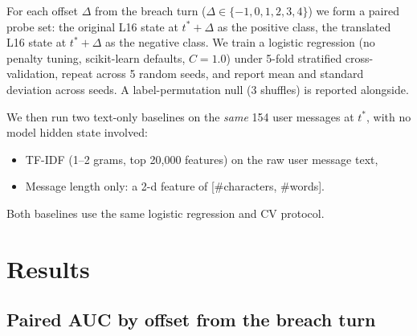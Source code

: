 \documentclass[11pt]{article}
\begin{document}
For each offset $\Delta$ from the breach turn ($\Delta \in \{-1, 0, 1, 2, 3, 4\}$) we form a paired probe set: the original L16 state at $t^*+\Delta$ as the positive class, the translated L16 state at $t^*+\Delta$ as the negative class.
We train a logistic regression (no penalty tuning, scikit-learn defaults, $C=1.0$) under 5-fold stratified cross-validation, repeat across 5 random seeds, and report mean and standard deviation across seeds.
A label-permutation null (3 shuffles) is reported alongside.

We then run two text-only baselines on the \emph{same} 154 user messages at $t^*$, with no model hidden state involved:
\begin{itemize}[leftmargin=*]
  \item TF-IDF (1--2 grams, top 20{,}000 features) on the raw user message text,
  \item Message length only: a 2-d feature of [\#characters, \#words].
\end{itemize}
Both baselines use the same logistic regression and CV protocol.

\section{Results}
\label{sec:results}

\subsection{Paired AUC by offset from the breach turn}
\end{document}
